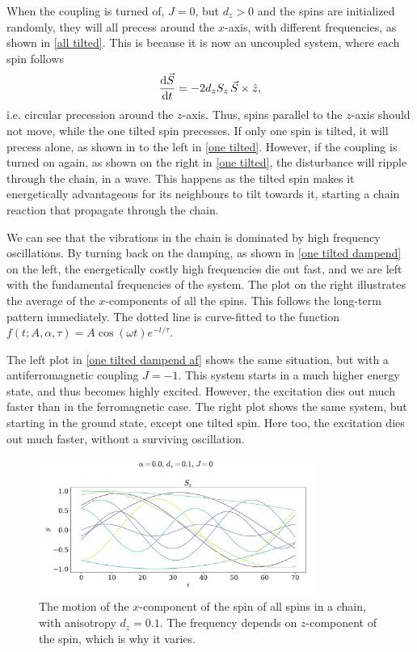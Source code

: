 \documentclass{article}
\begin{document}
    When the coupling is turned of, $J = 0$, but $d_z>0$ and the spins are initialized randomly, they will all precess around the $x$-axis, with different frequencies, as shown in \autoref{all tilted}.
    This is because it is now an uncoupled system, where each spin follows 
    \begin{equation*}
        \dv{\vec S}{t} = - 2 d_z S_z \,\vec S \times \hat z, 
    \end{equation*}
    i.e.
    circular precession around the $z$-axis.
    Thus, spins parallel to the $z$-axis should not move, while the one tilted spin precesses.
    If only one spin is tilted, it will precess alone, as shown in to the left in \autoref{one tilted}.
    However, if the coupling is turned on again, as shown on the right in \autoref{one tilted}, the disturbance will ripple through the chain, in a wave.
    This happens as the tilted spin makes it energetically advantageous for its neighbours to tilt towards it, starting a chain reaction that propagate through the chain.

    We can see that the vibrations in the chain is dominated by high frequency oscillations.
    By turning back on the damping, as shown in \autoref{one tilted dampend} on the left, the energetically costly high frequencies die out fast, and we are left with the fundamental frequencies of the system.
    The plot on the right illustrates the average of the $x$-components of all the spins.
    This follows the long-term pattern immediately.
    The dotted line is curve-fitted to the function $f(t; A, \alpha, \tau) = A \cos(\omega t) e^{-t/\tau}$.

    The left plot in \autoref{one tilted dampend af} shows the same situation, but with a antiferromagnetic coupling $J = -1$.
    This system starts in a much higher energy state, and thus becomes highly excited.
    However, the excitation dies out much faster than in the ferromagnetic case.
    The right plot shows the same system, but starting in the ground state, except one tilted spin.
    Here too, the excitation dies out much faster, without a surviving oscillation.

    \begin{figure}[H]
        \centering
        \includegraphics[width=0.8\textwidth]{../plots/2221a.pdf}
        \caption{The motion of the $x$-component of the spin of all spins in a chain, with anisotropy $d_z=0.1$. The frequency depends on $z$-component of the spin, which is why it varies.}
        \label{all tilted}
    \end{figure}
\end{document}
